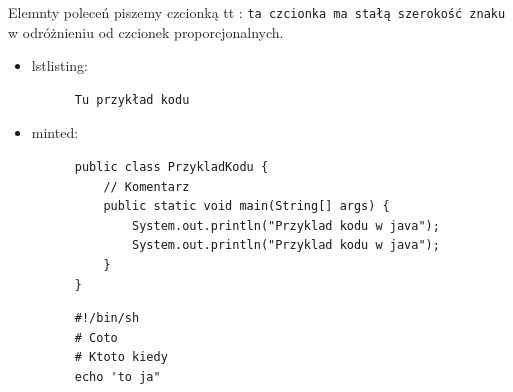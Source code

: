 \documentclass[a4paper,11pt]{article}
\begin{document}

Elemnty poleceń piszemy czcionką tt : {\tt ta czcionka ma stałą szerokość znaku}
w odróżnieniu od czcionek proporcjonalnych.

\begin{itemize}
  \item lstlisting:
  \begin{lstlisting}
      Tu przykład kodu
  \end{lstlisting}

  \item minted:
  \begin{verbatim}
      public class PrzykladKodu {
          // Komentarz
          public static void main(String[] args) {
              System.out.println("Przyklad kodu w java");
              System.out.println("Przyklad kodu w java");
          }
      }
  \end{verbatim}

  \begin{verbatim}
      #!/bin/sh
      # Coto
      # Ktoto kiedy
      echo 'to ja"
  \end{verbatim}
\end{itemize}

  \begin{figure}[!ht]
    \centering
  \end{figure}
\end{document}
